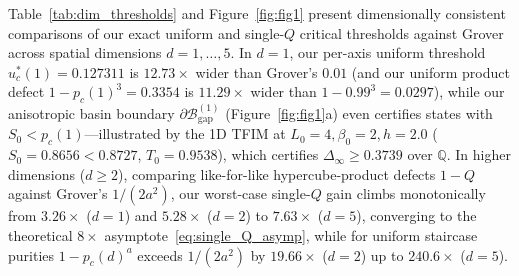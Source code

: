 \documentclass[11pt,a4paper]{article}
\theoremstyle{definition}
\newcommand{\Q}{\mathbb{Q}}
\newcommand{\Bgap}{\mathcal{B}_{\mathrm{gap}}}
\begin{document}
Table~\ref{tab:dim_thresholds} and Figure~\ref{fig:fig1} present dimensionally consistent comparisons of our exact uniform and single-$Q$ critical thresholds against Grover~\cite{Grover2026Extensions} across spatial dimensions $d = 1,\dots,5$. In $d=1$, our per-axis uniform threshold $u_c^*(1) = 0.127311$ is $\mathbf{12.73\times}$ wider than Grover's $0.01$ (and our uniform product defect $1 - p_c(1)^3 = 0.3354$ is $11.29\times$ wider than $1 - 0.99^3 = 0.0297$), while our anisotropic basin boundary $\partial \Bgap^{(1)}$ (Figure~\ref{fig:fig1}a) even certifies states with $S_0 < p_c(1)$—illustrated by the 1D TFIM at $L_0=4, \beta_0=2, h=2.0$ ($S_0 = 0.8656 < 0.8727$, $T_0 = 0.9538$), which certifies $\Delta_\infty \ge 0.3739$ over $\Q$. In higher dimensions ($d \ge 2$), comparing like-for-like hypercube-product defects $1 - Q$ against Grover's $1/(2a^2)$, our worst-case single-$Q$ gain climbs monotonically from $3.26\times$ ($d=1$) and $5.28\times$ ($d=2$) to $7.63\times$ ($d=5$), converging to the theoretical $8\times$ asymptote~\eqref{eq:single_Q_asymp}, while for uniform staircase purities $1 - p_c(d)^a$ exceeds $1/(2a^2)$ by $19.66\times$ ($d=2$) up to $240.6\times$ ($d=5$).
\end{document}
